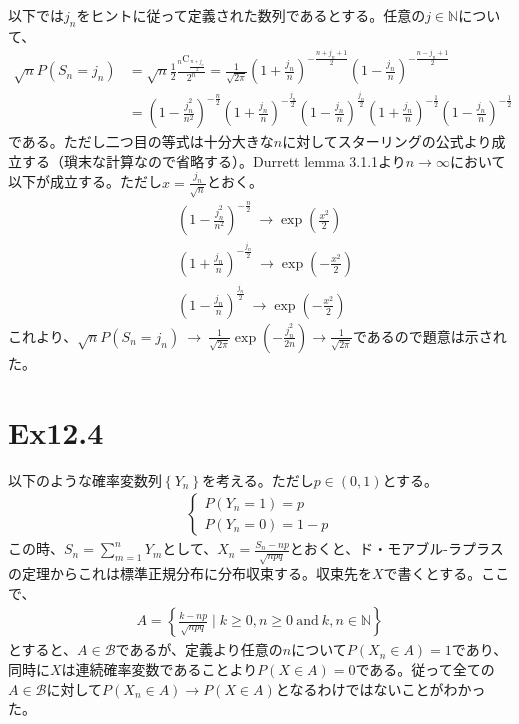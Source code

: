 \documentclass{article}
\begin{document}
以下では$j_n$をヒントに従って定義された数列であるとする。任意の$j \in \mathbb{N}$について、
\begin{align*}
	\sqrt{n} P\left( S_n = j_n \right) &= \sqrt{n} \frac{1}{2} \frac{ {}_n \mathrm{C} _\frac{n+j_n}{2}}{2^n} = \frac{1}{\sqrt{2\pi}} \left( 1 + \frac{j_n}{n} \right)^{-\frac{n+j_n+1}{2}}\left( 1 - \frac{j_n}{n} \right)^{-\frac{n-j_n+1}{2}}\\[10pt]
	&= \left( 1- \frac{j_n^2}{n^2} \right)^{-\frac{n}{2}} \left( 1+\frac{j_n}{n} \right)^{-\frac{j_n}{2}} \left( 1- \frac{j_n}{n} \right)^{\frac{j_n}{2}}\left( 1+\frac{j_n}{n} \right)^{-\frac{1}{2}} \left( 1-\frac{j_n}{n} \right)^{-\frac{1}{2}}
\end{align*}
である。ただし二つ目の等式は十分大きな$n$に対してスターリングの公式より成立する（瑣末な計算なので省略する）。Durrett lemma 3.1.1より$n\to \infty$において以下が成立する。ただし$x = \frac{j_n}{\sqrt{n}}$とおく。
\begin{align*}
	&\left( 1-\frac{j_n^2}{n^2} \right)^{-\frac{n}{2}}\ \to \exp\left( \frac{x^2}{2} \right)\\[8pt]
	&\left( 1+\frac{j_n}{n} \right)^{-\frac{j_n}{2}}\ \to \exp\left( -\frac{x^2}{2} \right)\\[8pt]
	&\left( 1-\frac{j_n}{n} \right)^{\frac{j_n}{2}}\ \to \exp\left( -\frac{x^2}{2} \right)
\end{align*}
これより、$\sqrt{n} P\left( S_n = j_n \right)\ \to\ \frac{1}{\sqrt{2\pi}} \exp\left( -\frac{j_n^2}{2n} \right) \to \frac{1}{\sqrt{2\pi}}$であるので題意は示された。


\section{Ex12.4}
以下のような確率変数列$\left\{ Y_n \right\}$を考える。ただし$p\in (0,1)$とする。
\begin{align*}
\begin{cases}
	P\left( Y_n = 1 \right) = p\\[8pt]
	P\left( Y_n = 0 \right) = 1-p
\end{cases}
\end{align*}
この時、$S_n = \sum_{m=1}^n Y_m$として、$X_n = \frac{S_n -np}{\sqrt{npq}}$とおくと、ド・モアブル-ラプラスの定理からこれは標準正規分布に分布収束する。収束先を$X$で書くとする。ここで、
\begin{align*}
	A = \left\{ \frac{k-np}{\sqrt{npq}} \mid k \geq 0, n\geq 0\ \text{and}\ k,n \in \mathbb{N} \right\}
\end{align*}
とすると、$A\in \mathcal{B}$であるが、定義より任意の$n$について$P\left( X_n \in A \right) = 1$であり、同時に$X$は連続確率変数であることより$P\left( X \in A \right) = 0$である。従って全ての$A\in \mathcal{B}$に対して$P\left( X_n \in A \right)\to P\left( X\in A\right)$となるわけではないことがわかった。
\end{document}
